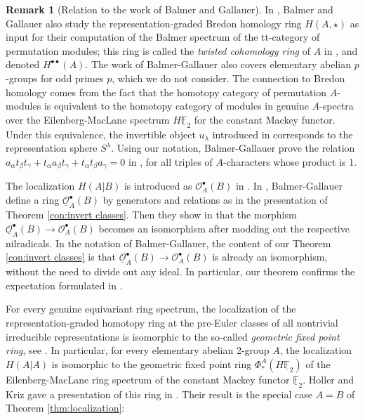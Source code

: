 \documentclass{amsart}[12pt]
\newcommand{\mF}{{\mathbb F}}
\renewcommand{\to}{\longrightarrow}
\numberwithin{equation}{section}
\theoremstyle{definition}
\newtheorem{rk}[equation]{Remark}
\begin{document}
\begin{rk}[Relation to the work of Balmer and Gallauer]\label{rk:balmer-gallauer}
  In \cite{balmer-gallauer},
  Balmer and Gallauer also study the representation-graded Bredon homology ring
  $H(A,\star)$ as input for their computation of the Balmer spectrum of the tt-category of
  permutation modules;
  this ring is called the {\em twisted cohomology ring} of $A$
  in \cite[Definition 3.16]{balmer-gallauer}, and denoted $H^{\bullet\bullet}(A)$.
  The work of Balmer-Gallauer also covers elementary abelian $p$-groups
  for odd primes $p$, which we do not consider.
  The connection to Bredon homology comes from the fact that the homotopy category
  of permutation $A$-modules is equivalent to the homotopy category of modules in
  genuine $A$-spectra over the Eilenberg-MacLane spectrum $H\underline\mF_2$
  for the constant Mackey functor. 
  Under this equivalence, the invertible object $u_\lambda$
  introduced in \cite[Definition 3.3]{balmer-gallauer}
  corresponds to the representation sphere $S^\lambda$.
  Using our notation, Balmer-Gallauer prove the relation
  $ a_\alpha t_\beta  t_\gamma + t_\alpha a_\beta t_\gamma + t_\alpha t_\beta a_\gamma = 0$
  in \cite[Lemma 8.4]{balmer-gallauer},
  for all triples of $A$-characters whose product is 1.

  The localization $H(A|B)$ is introduced as $\mathcal O^\bullet_A(B)$
  in \cite[Definition 5.9]{balmer-gallauer}.
  In \cite[Construction 8.5]{balmer-gallauer},
  Balmer-Gallauer define a ring $\underline{\mathcal O}_A^\bullet(B)$
  by generators and relations as in the presentation of Theorem \ref{con:invert classes}.
  Then they show in \cite[Theorem 8.13]{balmer-gallauer}
  that the morphism $\underline{\mathcal O}_A^\bullet(B)\to \mathcal O_A^\bullet(B)$
  becomes an isomorphism after modding out the respective nilradicals.
  In the notation of Balmer-Gallauer,
  the content of our Theorem \ref{con:invert classes} is that
  $\underline{\mathcal O}_A^\bullet(B)\to \mathcal O_A^\bullet(B)$
  is already an isomorphism, without the need to divide out any ideal.
  In particular, our theorem confirms the expectation formulated in
  \cite[Remark 8.15]{balmer-gallauer}.
\end{rk}


For every genuine equivariant ring spectrum, the localization of the representation-graded
homotopy ring at the pre-Euler classes of all nontrivial irreducible representations
is isomorphic to the so-called {\em geometric fixed point ring},
see \cite[Proposition 3.20]{greenlees-may:eqstho}.
In particular, for every elementary abelian 2-group $A$,
the localization $H(A|A)$ is isomorphic to the geometric fixed point ring
$\Phi^A_*(H\underline\mF_2)$ of the Eilenberg-MacLane ring spectrum
of the constant Mackey functor $\underline \mF_2$.
Holler and Kriz gave a presentation of this ring in \cite[Theorem 2]{holler-kriz}. 
Their result is the special case $A=B$ of Theorem \ref{thm:localization}:
\end{document}
